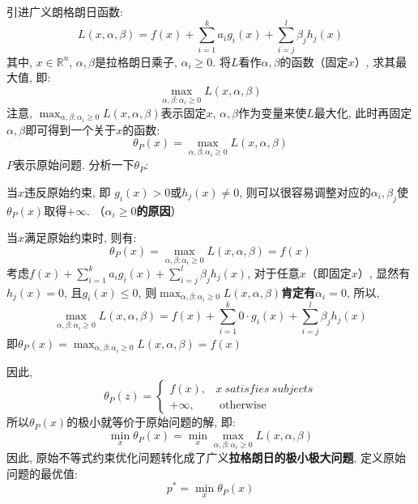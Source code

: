引进广义朗格朗日函数: 
$$
L(x, \alpha, \beta) = f(x) + \sum_{i=1}^k a_i g_i(x) + \sum_{i=j}^l \beta_j h_j(x)
$$
其中, $x \in \mathbb{R}^n$, $\alpha, \beta$是拉格朗日乘子, $\alpha_i \geqslant 0$. 将$L$看作$\alpha, \beta$的函数（固定$x$）, 求其最大值, 即: 
$$
\mathop{max}_{\alpha, \beta:\alpha_i \geqslant 0} L(x, \alpha, \beta)
$$
注意, $\mathop{max}_{\alpha, \beta:\alpha_i \geqslant 0} L(x, \alpha, \beta)$表示固定$x$, $\alpha, \beta$作为变量来使$L$最大化, 此时再固定$\alpha, \beta$即可得到一个关于$x$的函数: 
$$
\theta_P (x) = \mathop{max}_{\alpha, \beta:\alpha_i \geqslant 0} L(x, \alpha, \beta)
$$
$P$表示原始问题. 分析一下$\theta_P$: 
\begin{myitemize}
	\item 当$x$违反原始约束, 即 $g_i(x) > 0$或$h_j(x) \neq 0$, 则可以很容易调整对应的$\alpha_i, \beta_j$使$\theta_P(x)$取得$+\infty$. （\textbf{$\alpha_i \geqslant 0$的原因}）
	\item 当$x$满足原始约束时, 则有: 
	$$
	\theta_P(x) = \mathop{max}_{\alpha, \beta:\alpha_i \geqslant 0} L(x, \alpha, \beta) = f(x)
	$$
	考虑$f(x) + \sum_{i=1}^k a_i g_i(x) + \sum_{i=j}^l \beta_j h_j(x)$, 对于任意$x$（即固定$x$）, 显然有$h_j(x) = 0$, 且$g_i(x) \leqslant 0$, 则$\mathop{max}_{\alpha, \beta:\alpha_i \geqslant 0} L(x, \alpha, \beta)$\textbf{肯定有$\alpha_i = 0$}, 所以, 
	$$
	\mathop{max}_{\alpha, \beta:\alpha_i \geqslant 0} L(x, \alpha, \beta) = f(x) + \sum_{i=1}^k 0 \cdot g_i(x) + \sum_{i=j}^l \beta_j h_j(x)
	$$
	即$\theta_P(x) = \mathop{max}_{\alpha, \beta:\alpha_i \geqslant 0} L(x, \alpha, \beta) = f(x)$
\end{myitemize}
因此, 
$$
\theta_P(z)= \begin{cases}f(x), & x\ satisfies\ subjects \\ +\infty, & \text { otherwise }\end{cases}
$$
所以$\theta_P(x)$的极小就等价于原始问题的解, 即: 
$$
\mathop{min}_{x} \theta_P(x) = \mathop{min}_{x} \mathop{max}_{\alpha, \beta: \alpha_i \geqslant 0} L(x, \alpha, \beta)
$$
因此, 原始不等式约束优化问题转化成了广义\textbf{拉格朗日的极小极大问题}, 定义原始问题的最优值: 
$$
p^* = \mathop{min}_{x} \theta_P(x)
$$

